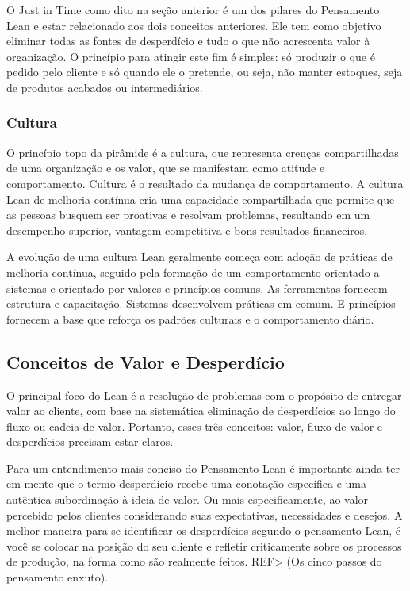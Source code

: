 O Just in Time como dito na seção anterior é um dos pilares do Pensamento Lean e estar relacionado aos dois conceitos anteriores. Ele tem como objetivo eliminar todas as fontes de desperdício e tudo o que não acrescenta valor à organização. O princípio para atingir este fim é simples: só produzir o que é pedido pelo cliente e só quando ele o pretende, ou seja, não manter estoques, seja de produtos acabados ou intermediários. 

\subsubsection[Cultura]{Cultura}

O princípio topo da pirâmide é a cultura, que representa crenças compartilhadas de uma organização e os valor, que se manifestam como atitude e comportamento. Cultura é o resultado da mudança de comportamento. A cultura Lean de melhoria contínua cria uma capacidade compartilhada que permite que as pessoas busquem ser proativas e resolvam problemas, resultando em um desempenho superior, vantagem competitiva e bons resultados financeiros.

A evolução de uma cultura Lean geralmente começa com adoção de práticas de melhoria contínua, seguido pela formação de um comportamento orientado a sistemas e orientado por valores e princípios comuns. As ferramentas fornecem estrutura e capacitação. Sistemas desenvolvem práticas em comum. E princípios fornecem a base que reforça os padrões culturais e o comportamento diário.

\subsection[Conceitos de Valor e Desperdício]{Conceitos de Valor e Desperdício}

O principal foco do Lean é a resolução de problemas com o propósito de entregar valor ao cliente, com base na sistemática eliminação de desperdícios ao longo do fluxo ou cadeia de valor. Portanto, esses três conceitos: valor, fluxo de valor e desperdícios precisam estar claros.

Para um entendimento mais conciso do Pensamento Lean é importante ainda ter em mente que o termo desperdício recebe uma conotação específica e uma autêntica subordinação à ideia de valor. Ou mais especificamente, ao valor percebido pelos clientes considerando suas expectativas, necessidades e desejos. A melhor maneira para se identificar os desperdícios segundo o pensamento Lean, é você se colocar na posição do seu cliente e refletir criticamente sobre os processos de produção, na forma como são realmente feitos. REF> (Os cinco passos do pensamento enxuto).

